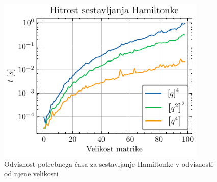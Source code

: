 \documentclass[slovene,11pt,a4paper]{article}
\begin{document}
\begin{figure}[ht]
\begin{center}
  \includegraphics[width=10cm]{graphs/q4_speed.pdf}
  \caption{Odvisnost potrebnega časa za sestavljanje Hamiltonke v odvisnosti od njene velikosti}
  \label{fig: q4 speed}
\end{center}
\end{figure}
\end{document}
